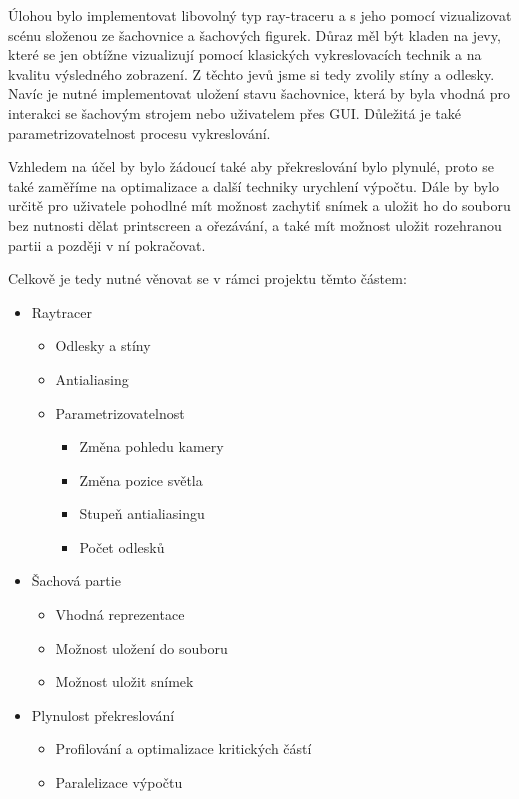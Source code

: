 \documentclass[12pt,a4paper,titlepage,final]{report}
\begin{document}
Úlohou bylo implementovat libovolný typ ray-traceru a s jeho pomocí vizualizovat scénu složenou ze šachovnice a šachových figurek. Důraz měl být kladen na jevy, které se jen obtížne vizualizují pomocí klasických vykreslovacích technik a na kvalitu výsledného zobrazení. Z těchto jevů jsme si tedy zvolily stíny a odlesky. Navíc je nutné implementovat uložení stavu šachovnice, která by byla vhodná pro interakci se šachovým strojem nebo uživatelem přes GUI. Důležitá je také parametrizovatelnost procesu vykreslování.

Vzhledem na účel by bylo žádoucí také aby překreslování bylo plynulé, proto se také zaměříme na optimalizace a další techniky urychlení výpočtu. Dále by bylo určitě pro uživatele pohodlné mít možnost zachytiť snímek a uložit ho do souboru bez nutnosti dělat printscreen a ořezávání, a také mít možnost uložit rozehranou partii a později v ní pokračovat.   

Celkově je tedy nutné věnovat se v rámci projektu těmto částem:
\begin{itemize}
	\item Raytracer
	\begin{itemize}
		\item Odlesky a stíny
		\item Antialiasing
		\item Parametrizovatelnost
		\begin{itemize}
			\item Změna pohledu kamery
			\item Změna pozice světla
			\item Stupeň antialiasingu
			\item Počet odlesků
		\end{itemize}
	\end{itemize}
	\item Šachová partie
	\begin{itemize}
		\item Vhodná reprezentace
		\item Možnost uložení do souboru
		\item Možnost uložit snímek 
	\end{itemize}
	\item Plynulost překreslování
	\begin{itemize}
		\item Profilování a optimalizace kritických částí
		\item Paralelizace výpočtu
	\end{itemize}
\end{itemize}
\end{document}
